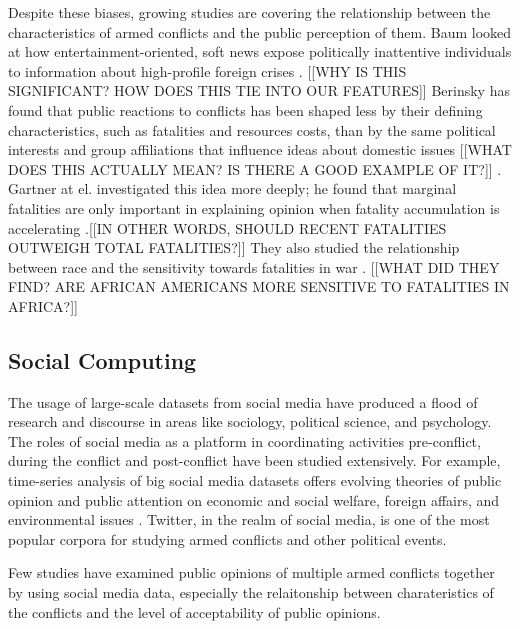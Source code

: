 Despite these biases, growing studies are covering the relationship between the characteristics of armed conflicts and the public perception of them. Baum looked at how entertainment-oriented, soft news expose politically inattentive individuals to information about high-profile foreign crises \cite{Baum2002}. [[WHY IS THIS SIGNIFICANT? HOW DOES THIS TIE INTO OUR FEATURES]] Berinsky has found that public reactions to conflicts has been shaped less by their defining characteristics, such as fatalities and resources costs, than by the same political interests and group affiliations that influence ideas about domestic issues [[WHAT DOES THIS ACTUALLY MEAN? IS THERE A GOOD EXAMPLE OF IT?]] \cite{Berinsky2009}. Gartner at el. investigated this idea more deeply; he found that marginal fatalities are only important in explaining opinion when fatality accumulation is accelerating \cite{Gartner1998}.[[IN OTHER WORDS, SHOULD RECENT FATALITIES OUTWEIGH TOTAL FATALITIES?]] They also studied the relationship between race and the sensitivity towards fatalities in war \cite{Gartner2000}. [[WHAT DID THEY FIND? ARE AFRICAN AMERICANS MORE SENSITIVE TO FATALITIES IN AFRICA?]]

\subsection{Social Computing}
The usage of large-scale datasets from social media have produced a flood of research and discourse in areas like sociology, political science, and psychology. The roles of social media as a platform in coordinating activities pre-conflict, during the conflict and post-conflict have been studied extensively. For example, time-series analysis of big social media datasets offers evolving theories of public opinion and public attention on economic and social welfare, foreign affairs, and environmental issues \cite{RussellNeuman2014}. Twitter, in the realm of social media, is one of the most popular corpora for studying armed conflicts and other political events. 


Few studies have examined public opinions of multiple armed conflicts together by using social media data, especially the relaitonship between charateristics of the conflicts and the level of acceptability of public opinions.

